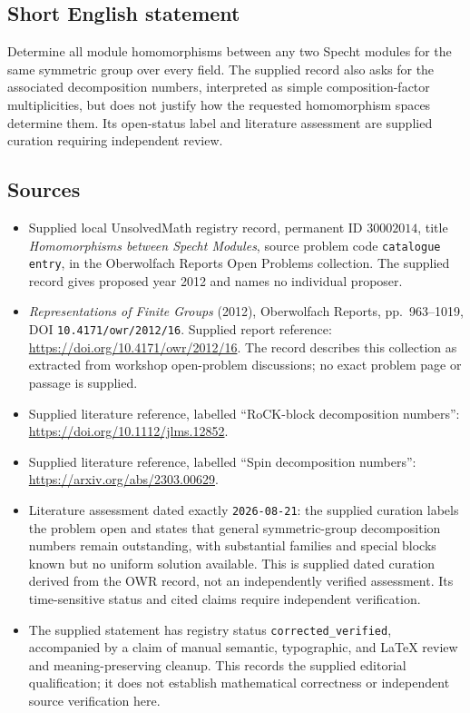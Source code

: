 \documentclass[11pt]{article}
\begin{document}
\subsection{Short English statement}
Determine all module homomorphisms between any two Specht modules for the same symmetric group over every field. The supplied record also asks for the associated decomposition numbers, interpreted as simple composition-factor multiplicities, but does not justify how the requested homomorphism spaces determine them. Its open-status label and literature assessment are supplied curation requiring independent review.
\subsection{Sources}
\begin{itemize}
\item Supplied local UnsolvedMath registry record, permanent ID \(30002014\), title \emph{Homomorphisms between Specht Modules}, source problem code \texttt{catalogue entry}, in the Oberwolfach Reports Open Problems collection. The supplied record gives proposed year 2012 and names no individual proposer.
\item \emph{Representations of Finite Groups} (2012), Oberwolfach Reports, pp.\ 963--1019, DOI \texttt{10.4171/owr/2012/16}. Supplied report reference: \url{https://doi.org/10.4171/owr/2012/16}. The record describes this collection as extracted from workshop open-problem discussions; no exact problem page or passage is supplied.
\item Supplied literature reference, labelled ``RoCK-block decomposition numbers'': \url{https://doi.org/10.1112/jlms.12852}.
\item Supplied literature reference, labelled ``Spin decomposition numbers'': \url{https://arxiv.org/abs/2303.00629}.
\item Literature assessment dated exactly \texttt{2026-08-21}: the supplied curation labels the problem open and states that general symmetric-group decomposition numbers remain outstanding, with substantial families and special blocks known but no uniform solution available. This is supplied dated curation derived from the OWR record, not an independently verified assessment. Its time-sensitive status and cited claims require independent verification.
\item The supplied statement has registry status \texttt{corrected\_verified}, accompanied by a claim of manual semantic, typographic, and LaTeX review and meaning-preserving cleanup. This records the supplied editorial qualification; it does not establish mathematical correctness or independent source verification here.
\end{itemize}
\end{document}
